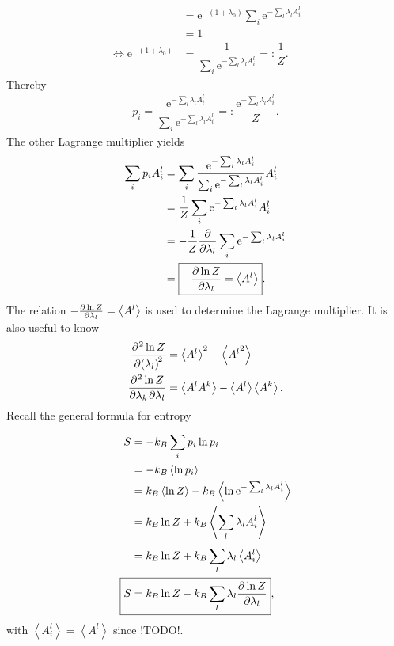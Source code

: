 \documentclass[a4paper,10pt]{article}
\numberwithin{equation}{section}
\begin{document}
\begin{multicols}{2}
\begin{align}
                 &= \text{e}^{-(1+\lambda _0)}\sum_{i}^{}\text{e}^{-\sum_{l}^{}\lambda _lA_i^l}\\
                 &= 1\\
  \Leftrightarrow \text{e}^{-(1+\lambda _0)} &= \dfrac{1}{\sum_{i}^{}\text{e}^{-\sum_{l}^{}\lambda _lA_i^l}}=:\dfrac{1}{Z}
.\end{align} 
Thereby
\begin{align} 
  \boxed{p_i=\dfrac{\text{e}^{-\sum_{l}^{}\lambda _lA_i^l}}{\sum_{i}^{}\text{e}^{-\sum_{l}^{}\lambda _lA_i^l}}=:\dfrac{\text{e}^{-\sum_{l}^{}\lambda _lA_i^l}}{Z}}
.\end{align} 
The other Lagrange multiplier yields
\begin{align} 
  \sum_{i}^{}p_iA_i^l &= \sum_{i}^{}\dfrac{\text{e}^{-\sum_{l}^{}\lambda _lA_i^l}}{\sum_{i}^{}\text{e}^{-\sum_{l}^{}\lambda _lA_i^l}}A_i^l\\
                      &= \dfrac{1}{Z}\sum_{i}^{}\text{e}^{-\sum_{l}^{}\lambda _lA_i^l}A_i^l\\
                      &= -\dfrac{1}{Z}\diffp*[]{\sum_{i}^{}\text{e}^{-\sum_{l}^{}\lambda _lA_i^l}}{\lambda _l}\\
                      &= \boxed{-\diffp[]{\ln Z}{\lambda _l} = \left\langle A^l\right\rangle }
.\end{align} 
The relation $-\diffp[]{\ln Z}{\lambda _l} = \left\langle A^l\right\rangle $ is used to determine the Lagrange multiplier.
It is also useful to know
\begin{align} 
  \diffp[2]{\ln Z}{\lambda _l} &= \left\langle A^l\right\rangle ^2-\left\langle {A^l}^2\right\rangle \\
  \diffp[]{\ln Z}{\lambda _k,\lambda _l} &= \left\langle A^lA^k\right\rangle -\left\langle A^l\right\rangle \left\langle A^k\right\rangle 
.\end{align}
Recall the general formula for entropy
\begin{align} 
  S &= -k_B\sum_{i}^{}p_i\ln p_i\\
    &= -k_B\left\langle \ln p_i\right\rangle \\
    &= k_B\left\langle \ln Z\right\rangle -k_B\left\langle \ln \text{e}^{-\sum_{l}^{}\lambda _lA^l_i}\right\rangle \\
    &= k_B\ln Z + k_B\left\langle \sum_{l}^{}\lambda _lA_i^l\right\rangle \\
    &= k_B\ln Z + k_B\sum_{l}^{}\lambda _l\left\langle A_i^l\right\rangle \\
\Aboxed{S &= k_B\ln Z - k_B\sum_{l}^{}\lambda _l\diffp[]{\ln Z}{\lambda _l}}
,\end{align} 
with $\left\langle A_i^l\right\rangle =\left\langle A^l\right\rangle $ since !TODO!.


\end{multicols}
\end{document}
